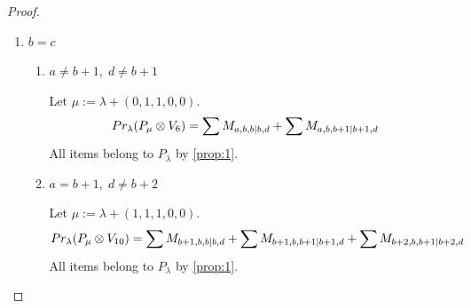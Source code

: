 \begin{proof}
\begin{enumerate}
  \item $b=c$
    \begin{enumerate}
      \item $a \neq b+1 ,\; d\neq b+1$\par
        Let $\mu:=\lambda + (0,1,1,0,0) $.
        \begin{equation}\notag
          \begin{aligned}
            Pr_{\lambda}(P_\mu \otimes V_{6}) &=
\sum M_{a,b,b|b,d}
+ \sum M_{a,b,b+1|b+1,d}
          \end{aligned}
        \end{equation}
All items belong to $P_\lambda$ by \cref{prop:1}.

      \item $a = b+1, \;d\neq b+2 $\par
        Let $\mu:=\lambda + (1,1,1,0,0) $.
        \begin{equation}\notag
          \begin{aligned}
            Pr_{\lambda}(P_\mu \otimes V_{10}) &=
\sum M_{b+1,b,b|b,d}
+ \sum M_{b+1,b,b+1|b+1,d}
+ \sum M_{b+2,b,b+1|b+2,d}
          \end{aligned}
        \end{equation}
All items belong to $P_\lambda$ by \cref{prop:1}.


\end{enumerate}
\end{enumerate}
\end{proof}

